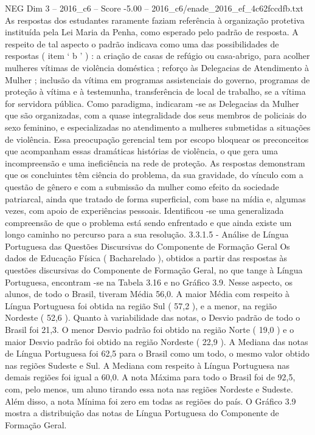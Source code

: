 \begin{textsample}{NEG Dim 3 – 2016\_c6 – Score -5.00 – 2016\_c6/enade\_2016\_ef\_4c62fccdfb.txt}
As respostas dos estudantes raramente faziam referência à organização protetiva instituída pela Lei Maria da Penha, como esperado pelo padrão de resposta.
A respeito de tal aspecto o padrão indicava como uma das possibilidades de respostas ( item ‘ b ’ ) : a criação de casas de refúgio ou casa-abrigo, para acolher mulheres vítimas de violência doméstica ; reforço às Delegacias de Atendimento à Mulher ; inclusão da vítima em programas assistenciais do governo, programas de proteção à vítima e à testemunha, transferência de local de trabalho, se a vítima for servidora pública.
Como paradigma, indicaram -se as Delegacias da Mulher que são organizadas, com a quase integralidade dos seus membros de policiais do sexo feminino, e especializadas no atendimento a mulheres submetidas a situações de violência.
Essa preocupação gerencial tem por escopo bloquear os preconceitos que acompanham essas dramáticas histórias de violência, o que gera uma incompreensão e uma ineficiência na rede de proteção.
As respostas demonstram que os concluintes têm ciência do problema, da sua gravidade, do vínculo com a questão de gênero e com a submissão da mulher como efeito da sociedade patriarcal, ainda que tratado de forma superficial, com base na mídia e, algumas vezes, com apoio de experiências pessoais.
Identificou -se uma generalizada compreensão de que o problema está sendo enfrentado e que ainda existe um longo caminho no percurso para a sua resolução. 3.3.1.5 - Análise de Língua Portuguesa das Questões Discursivas do Componente de Formação Geral Os dados de Educação Física ( Bacharelado ), obtidos a partir das respostas às questões discursivas do Componente de Formação Geral, no que tange à Língua Portuguesa, encontram -se na Tabela 3.16 e no Gráfico 3.9.
Nesse aspecto, os alunos, de todo o Brasil, tiveram Média 56,0.
A maior Média com respeito à Língua Portuguesa foi obtida na região Sul ( 57,2 ), e a menor, na região Nordeste ( 52,6 ).
Quanto à variabilidade das notas, o Desvio padrão de todo o Brasil foi 21,3.
O menor Desvio padrão foi obtido na região Norte ( 19,0 ) e o maior Desvio padrão foi obtido na região Nordeste ( 22,9 ).
A Mediana das notas de Língua Portuguesa foi 62,5 para o Brasil como um todo, o mesmo valor obtido nas regiões Sudeste e Sul.
A Mediana com respeito à Língua Portuguesa nas demais regiões foi igual a 60,0.
A nota Máxima para todo o Brasil foi de 92,5, com, pelo menos, um aluno tirando essa nota nas regiões Nordeste e Sudeste.
Além disso, a nota Mínima foi zero em todas as regiões do país.
O Gráfico 3.9 mostra a distribuição das notas de Língua Portuguesa do Componente de Formação Geral.

\end{textsample}
